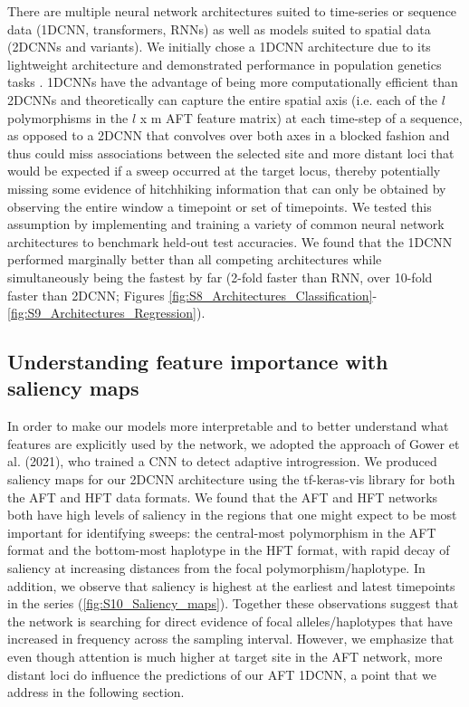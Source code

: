 There are multiple neural network architectures suited to time-series or sequence data (1DCNN, transformers, RNNs) as well as models suited to spatial data (2DCNNs and variants). We initially chose a 1DCNN architecture due to its lightweight architecture and demonstrated performance in population genetics tasks \cite{flagelUnreasonableEffectivenessConvolutional2019}. 1DCNNs have the advantage of being more computationally efficient than 2DCNNs and theoretically can capture the entire spatial axis (i.e. each of the $l$ polymorphisms in the $l$ x m AFT feature matrix) at each time-step of a sequence, as opposed to a 2DCNN that convolves over both axes in a blocked fashion and thus could miss associations between the selected site and more distant loci that would be expected if a sweep occurred at the target locus, thereby potentially missing some evidence of hitchhiking information that can only be obtained by observing the entire window a timepoint or set of timepoints. We tested this assumption by implementing and training a variety of common neural network architectures to benchmark held-out test accuracies. We found that the 1DCNN performed marginally better than all competing architectures while simultaneously being the fastest by far (2-fold faster than RNN, over 10-fold faster than 2DCNN; Figures \ref{fig:S8_Architectures_Classification}-\ref{fig:S9_Architectures_Regression}).  \\

\subsection{Understanding feature importance with saliency maps}

In order to make our models more interpretable and to better understand what features are explicitly used by the network, we adopted the approach of Gower et al. (2021), who trained a CNN to detect adaptive introgression. We produced saliency maps for our 2DCNN architecture using the tf-keras-vis library \cite{kubotaTfkerasvis2022} for both the AFT and HFT data formats. We found that the AFT and HFT networks both have high levels of saliency in the regions that one might expect to be most important for identifying sweeps: the central-most polymorphism in the AFT format and the bottom-most haplotype in the HFT format, with rapid decay of saliency at increasing distances from the focal polymorphism/haplotype. In addition, we observe that saliency is highest at the earliest and latest timepoints in the series (\ref{fig:S10_Saliency_maps}). Together these observations suggest that the network is searching for direct evidence of focal alleles/haplotypes that have increased in frequency across the sampling interval. However, we emphasize that even though attention is much higher at target site in the AFT network, more distant loci do influence the predictions of our AFT 1DCNN, a point that we address in the following section. \\

